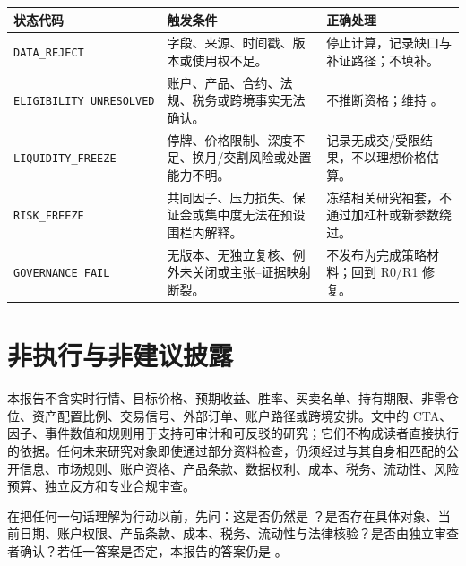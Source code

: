 \begin{exhibitbox}
\small
\begin{tabularx}{\exhibitboxwidth}{L{3.2cm}X L{3.7cm}}
\toprule
\textbf{状态代码} & \textbf{触发条件} & \textbf{正确处理} \\
\midrule
\texttt{DATA\_REJECT} & 字段、来源、时间戳、版本或使用权不足。 & 停止计算，记录缺口与补证路径；不填补。 \\
{\tiny\texttt{ELIGIBILITY\_UNRESOLVED}} & 账户、产品、合约、法规、税务或跨境事实无法确认。 & 不推断资格；维持 \qzero{}。 \\
\texttt{LIQUIDITY\_FREEZE} & 停牌、价格限制、深度不足、换月/交割风险或处置能力不明。 & 记录无成交/受限结果，不以理想价格估算。 \\
\texttt{RISK\_FREEZE} & 共同因子、压力损失、保证金或集中度无法在预设围栏内解释。 & 冻结相关研究袖套，不通过加杠杆或新参数绕过。 \\
\texttt{GOVERNANCE\_FAIL} & 无版本、无独立复核、例外未关闭或主张--证据映射断裂。 & 不发布为完成策略材料；回到 R0/R1 修复。 \\
\bottomrule
\end{tabularx}
\end{exhibitbox}

\section{非执行与非建议披露}

本报告不含实时行情、目标价格、预期收益、胜率、买卖名单、持有期限、非零仓位、资产配置比例、交易信号、外部订单、账户路径或跨境安排。文中的 CTA、因子、事件数值和规则用于支持可审计和可反驳的研究；它们不构成读者直接执行的依据。任何未来研究对象即使通过部分资料检查，仍须经过与其自身相匹配的公开信息、市场规则、账户资格、产品条款、数据权利、成本、税务、流动性、风险预算、独立反方和专业合规审查。

\begin{disclosurebox}[读者的最后检查]
\small
在把任何一句话理解为行动以前，先问：这是否仍然是 \qzero{}？是否存在具体对象、当前日期、账户权限、产品条款、成本、税务、流动性与法律核验？是否由独立审查者确认？若任一答案是否定，本报告的答案仍是 \noaction{}。
\end{disclosurebox}
